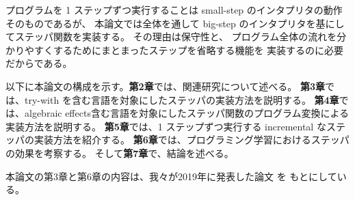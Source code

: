 プログラムを 1 ステップずつ実行することは
small-step のインタプリタの動作そのものであるが、
本論文では全体を通して big-step のインタプリタを基にしてステッパ関数を実装する。
その理由は保守性と、
プログラム全体の流れを分かりやすくするためにまとまったステップを省略する機能を
実装するのに必要だからである。

\vspace{1cm}
以下に本論文の構成を示す。{\bf 第2章}では、関連研究について述べる。
{\bf 第3章}では、try-with を含む言語を対象にしたステッパの実装方法を説明する。
{\bf 第4章}では、algebraic effects含む言語を対象にしたステッパ関数のプログラム変換による実装方法を説明する。
{\bf 第5章}では、1 ステップずつ実行する incremental なステッパの実装方法を紹介する。
{\bf 第6章}では、プログラミング学習におけるステッパの効果を考察する。
そして{\bf 第7章}で、結論を述べる。

本論文の第3章と第6章の内容は、我々が2019年に発表した論文 \cite{FCA19} を
もとにしている。
